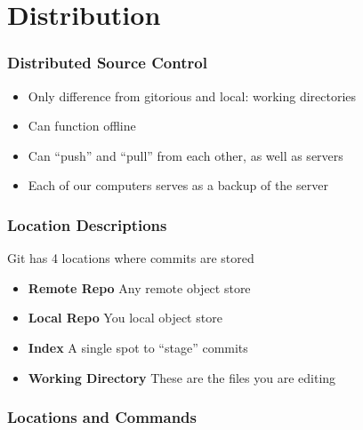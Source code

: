 \section{Distribution}

\begin{frame}
  \frametitle{Distributed Source Control}
  \begin{itemize}
  \item Only difference from gitorious and local: working directories
    \pause
  \item Can function offline
    \pause
  \item Can ``push'' and ``pull'' from each other, as well as servers
    \pause
  \item Each of our computers serves as a backup of the server
  \end{itemize}
\end{frame}

\begin{frame}
  \frametitle{Location Descriptions}
  Git has 4 locations where commits are stored
  \pause
  \begin{itemize}
  \item \textbf{Remote Repo} Any remote object store
    \pause
  \item \textbf{Local Repo} You local object store
    \pause
  \item \textbf{Index} A single spot to ``stage'' commits
    \pause
  \item \textbf{Working Directory} These are the files you are editing
  \end{itemize}
\end{frame}

\begin{frame}
  \frametitle{Locations and Commands}

\end{frame}

